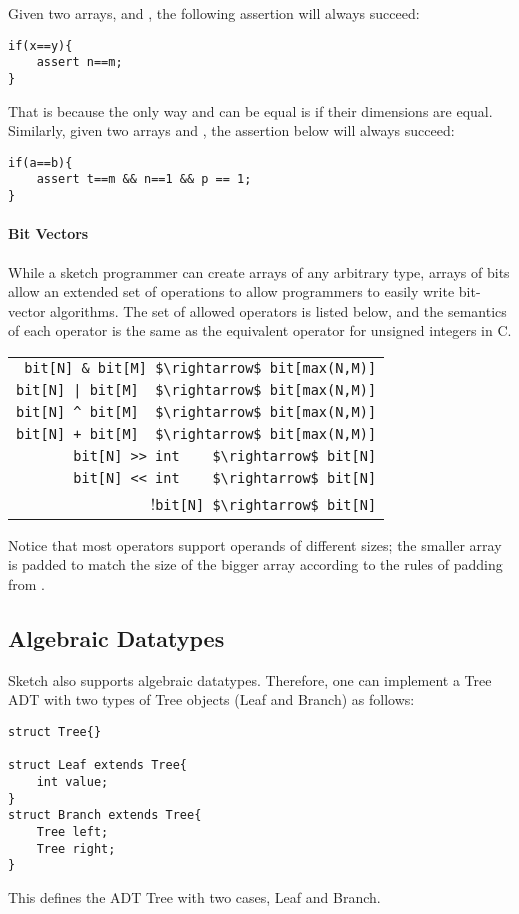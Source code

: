 \begin{Example}
Given two arrays,  and , the following assertion will always succeed:
\begin{lstlisting}
if(x==y){
	assert n==m;
}
\end{lstlisting}
That is because the only way  and  can be equal is if their dimensions are equal. Similarly, given two arrays  and , the assertion below will always succeed:
\begin{lstlisting}
if(a==b){
	assert t==m && n==1 && p == 1;
}
\end{lstlisting}
\end{Example}


\paragraph{Bit Vectors}
While a sketch programmer can create arrays of any arbitrary type, arrays of bits allow an extended set of operations to allow programmers to easily write bit-vector algorithms. The set of allowed operators is listed below, and the semantics of each operator is the same as the equivalent operator for unsigned integers in C.
\begin{center}
\begin{tabular}{r}
\lstinline!bit[N] & bit[M] $\rightarrow$ bit[max(N,M)]!\\
\lstinline!bit[N] | bit[M]  $\rightarrow$ bit[max(N,M)]!\\
\lstinline!bit[N] ^ bit[M]  $\rightarrow$ bit[max(N,M)]!\\
\lstinline!bit[N] + bit[M]  $\rightarrow$ bit[max(N,M)]!\\
\lstinline!bit[N] >> int    $\rightarrow$ bit[N]!\\
\lstinline!bit[N] << int    $\rightarrow$ bit[N]!\\
!\lstinline!bit[N] $\rightarrow$ bit[N]!\\
\end{tabular}
\end{center}

Notice that most operators support operands of different sizes; the smaller array is padded to match the size of the bigger array according to the rules of padding from . 



\subsection{Algebraic Datatypes}
Sketch also supports algebraic datatypes. Therefore, one can implement a Tree ADT with two types of Tree objects (Leaf and Branch) as follows:
\begin{lstlisting}
struct Tree{}

struct Leaf extends Tree{
	int value;
}
struct Branch extends Tree{
	Tree left;
	Tree right;
}
\end{lstlisting}
This defines the ADT Tree with two cases, Leaf and Branch.

